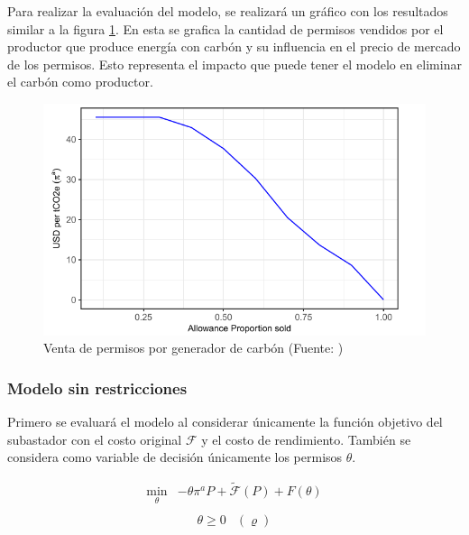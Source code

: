 Para realizar la evaluación del modelo, se realizará un gráfico con los resultados similar a la figura \ref{fig:fig6}. En esta se grafica la cantidad de permisos vendidos por el productor que produce energía con carbón y su influencia en el precio de mercado de los permisos. Esto representa el impacto que puede tener el modelo en eliminar el carbón como productor.

\begin{figure}[H]
    \centering
    \includegraphics[width=15cm]{docs/DocumentoMemoria/core/images/figura 6 amigo.png}
    \caption{Venta de permisos por generador de carbón (Fuente: \protect{})}
    \label{fig:fig6}
\end{figure}


\subsubsection{Modelo sin restricciones}

Primero se evaluará el modelo al considerar únicamente la función objetivo del subastador con el costo original $\mathcal{F}$ y el costo de rendimiento. También se considera como variable de decisión únicamente los permisos $\theta$.  

\begin{equation}
\begin{array}{rrclcl}
    \displaystyle \min_{\theta} & -\theta \pi^aP + \tilde{\mathcal{F}}(P)+F(\theta)  \label{fo:perfornorest}\\
\end{array}
\end{equation}
\begin{equation}
\begin{array}{cl}
    \theta \geq 0 & (\varrho)
\end{array}
\end{equation}


